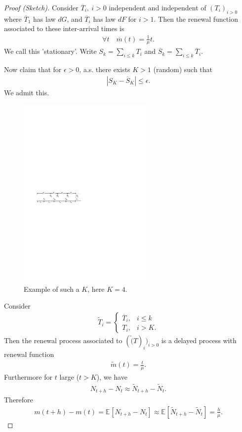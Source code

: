 \begin{proof}[Proof (Sketch)]
	Consider $\overline{T}_i,\ i> 0$ independent and independent of $(T_i)_{i> 0}$ where $\overline{T}_1$ has law $dG$, and $\overline{T}_{i}$ has law $dF$ for $i> 1$.
	Then the renewal function associated to these inter-arrival times is
	\begin{align}
		\forall t \quad \overline{m}(t) = \frac{1}{\mu }t.
	\end{align}
We call this 'stationary'. Write $S_k = \sum_{i\leq k}^{} T_i$ and $\overline{S}_k = \sum_{i \leq k}^{} \overline{T}_i$.

Now claim that for $\epsilon > 0$, a.s. there exists $K>1$ (random) such that
\begin{align}
|S_K - \overline{S}_K | \leq \epsilon.
\end{align}
We admit this.

\begin{figure}[h]
	\centering
	\includegraphics[width=0.6\textwidth]{figures/blackwell.pdf}
	\caption{Example of such a $K$, here $K=4$.}
\end{figure}


Consider 
\begin{align}
	\tilde{T}_i =
	\begin{cases}
		\overline{T}_i, & i \leq k \\
		T_i, & i>K.
	\end{cases}
\end{align}
Then the renewal process associated to $(\tilde(T)_i)_{i>0}$ is a delayed process with renewal function
\begin{align}
	\tilde{m}(t) = \frac{t}{\mu }.
\end{align}
Furthermore for $t$ large ($t>K$), we have
\begin{align}
	N_{t+h} - N_t \approx \tilde{N}_{t+h} - \tilde{N}_{t}.
\end{align}
Therefore
\begin{align}
	m(t+h) - m(t) = \mathbb{E}_{} \left[ N_{t+h} - N_t \right] \approx \mathbb{E}_{} \left[ \tilde{N}_{t+h} - \tilde{N}_{t} \right] = \frac{h}{\mu }.
\end{align}
\end{proof}

